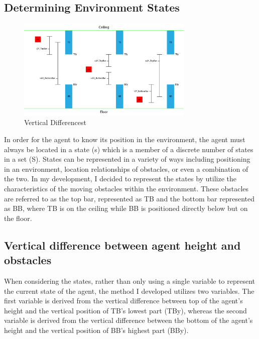 \documentclass{article}
\begin{document}
\subsection{Determining Environment States}

\begin{figure}[h]
    \centering
    \includegraphics[width=0.75\textwidth]{figure0}
    \caption{Vertical Differencest}
    \label{fig:mesh1}
\end{figure}



In order for the agent to know its position in the environment, the agent must always be located in a state (s) which is a member of a discrete number of states in a set (S). States can be represented in a variety of ways including positioning in an environment, location relationships of obstacles, or even a combination of the two. In my development, I decided to represent the states by utilize the characteristics of the moving obstacles within the environment. These obstacles are referred to as the top bar, represented as TB and the bottom bar represented as BB, where TB is on the ceiling while BB is positioned directly below but on the floor. 



\subsection{Vertical difference between agent height and obstacles}

When considering the states, rather than only using a single variable to represent the current state of the agent, the method I developed utilizes two variables. The first variable is derived from the vertical difference between top of the agent's height and the vertical position of TB's lowest part (TBy),  whereas the second variable is derived from the vertical difference between the bottom of the agent's height and the vertical position of BB's highest part (BBy).
\end{document}
